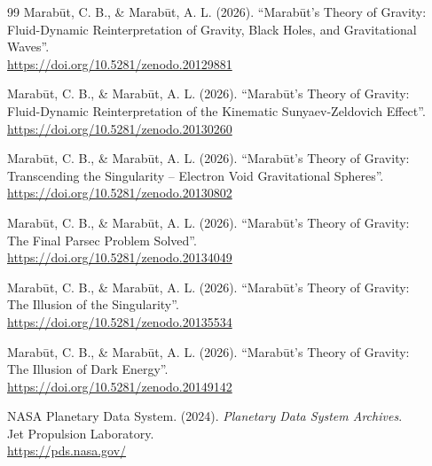 \documentclass[11pt, a4paper, table]{article}
\begin{document}
\begin{thebibliography}{99}
  Marab\={u}t, C. B., \& Marab\={u}t, A. L. (2026). ``Marab\={u}t's Theory of Gravity: \\
  Fluid-Dynamic Reinterpretation of Gravity, Black Holes, and Gravitational Waves''. \\ \url{https://doi.org/10.5281/zenodo.20129881}

  Marab\={u}t, C. B., \& Marab\={u}t, A. L. (2026). ``Marab\={u}t's Theory of Gravity: \\
  Fluid-Dynamic Reinterpretation of the Kinematic Sunyaev-Zeldovich Effect''. \\
  \url{https://doi.org/10.5281/zenodo.20130260}

  Marab\={u}t, C. B., \& Marab\={u}t, A. L. (2026). ``Marab\={u}t's Theory of Gravity: \\
  Transcending the Singularity -- Electron Void Gravitational Spheres''. \\
  \url{https://doi.org/10.5281/zenodo.20130802}

  Marab\={u}t, C. B., \& Marab\={u}t, A. L. (2026). ``Marab\={u}t's Theory of Gravity: \\
  The Final Parsec Problem Solved''. \\
  \url{https://doi.org/10.5281/zenodo.20134049}

  Marab\={u}t, C. B., \& Marab\={u}t, A. L. (2026). ``Marab\={u}t's Theory of Gravity: \\
  The Illusion of the Singularity''. \\
  \url{https://doi.org/10.5281/zenodo.20135534}

  Marab\={u}t, C. B., \& Marab\={u}t, A. L. (2026). ``Marab\={u}t's Theory of Gravity: \\
  The Illusion of Dark Energy''. \\
  \url{https://doi.org/10.5281/zenodo.20149142}

   NASA Planetary Data System. (2024). \textit{Planetary Data System Archives}. \\
  Jet Propulsion Laboratory. \\
  \url{https://pds.nasa.gov/}
  
\end{thebibliography}
\end{document}

